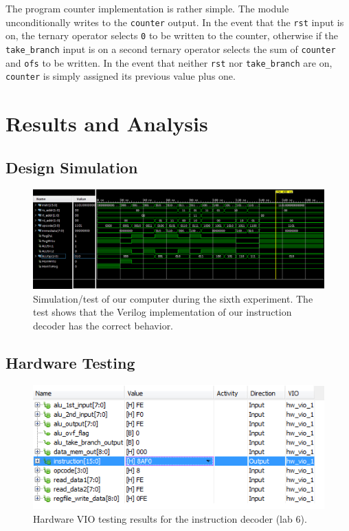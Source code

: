 \documentclass[12pt, letterpaper]{article}
\begin{document}
The program counter implementation is rather simple.  The module unconditionally writes to the \texttt{counter} output.  In the event that the \texttt{rst} input is on, the ternary operator selects \texttt{0} to be written to the counter, otherwise if the \texttt{take\_branch} input is on a second ternary operator selects the sum of \texttt{counter} and \texttt{ofs} to be written.  In the event that neither \texttt{rst} nor \texttt{take\_branch} are on, \texttt{counter} is simply assigned its previous value plus one.

\newpage
\section{Results and Analysis}

\subsection{Design Simulation}
\begin{figure}[h]
\centering
\includegraphics[width=\linewidth]{images/lab6-sim.png}
\caption{Simulation/test of our computer during the sixth experiment.  The test shows that the Verilog implementation of our instruction decoder has the correct behavior.}
\end{figure}


\subsection{Hardware Testing}
\FloatBarrier

\begin{figure}[h]
\centering
\includegraphics[width=0.8\linewidth]{images/lab6-hardware-test.png}
\caption{Hardware VIO testing results for the instruction decoder (lab 6).}
\end{figure}
\end{document}
